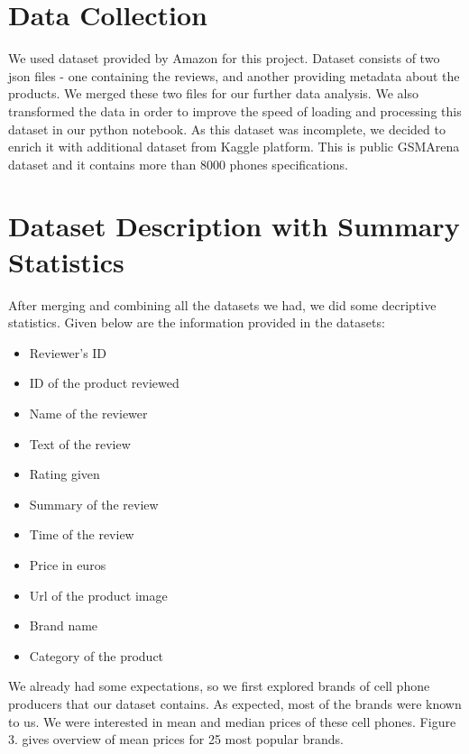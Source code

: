 \documentclass[11pt]{article}
\begin{document}
\section{Data Collection}
We used dataset provided by Amazon for this project. Dataset consists of two json files - one containing the reviews, and another providing metadata about the products. We merged these two files for our further data analysis. We also transformed the data in order to improve the speed of loading and processing this dataset in our python notebook. As this dataset was incomplete, we decided to enrich it with additional dataset from Kaggle platform. This is public GSMArena dataset and it contains more than 8000 phones specifications.


\section{Dataset Description with Summary Statistics}
After merging and combining all the datasets we had, we did some decriptive statistics. Given below are the information provided in the datasets:

\begin{itemize}
  \item Reviewer's ID
  \item ID of the product reviewed
  \item Name of the reviewer
  \item Text of the review
  \item Rating given
  \item Summary of the review
  \item Time of the review
  \item Price in euros
  \item Url of the product image
  \item Brand name
  \item Category of the product
\end{itemize}

We already had some expectations, so we first explored brands of cell phone producers that our dataset contains. As expected, most of the brands were known to us. We were interested in mean and median prices of these cell phones. Figure 3. gives overview of mean prices for 25 most popular brands.   
\end{document}
